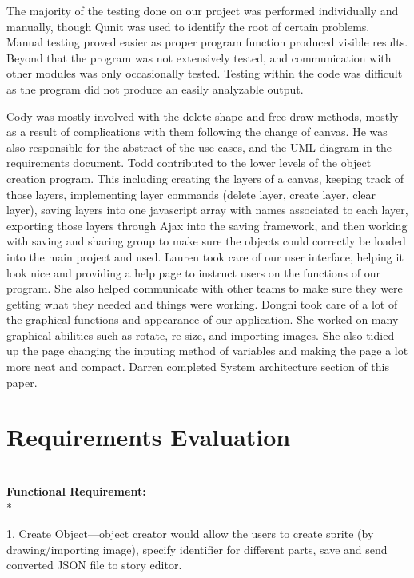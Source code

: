 \documentclass[a4paper, 11pt]{article} %
\begin{document}
        	The majority of the testing done on our project was performed individually and manually, though Qunit was used to identify the root of certain problems. Manual testing proved easier as proper program function produced visible results. Beyond that the program was not extensively tested, and communication with other modules was only occasionally tested. Testing within the code was difficult as the program did not produce an easily analyzable output.
        	
        	Cody was mostly involved with the delete shape and free draw methods, mostly as a result of complications with them following the change of canvas. He was also responsible for the abstract of the use cases, and the UML diagram in the requirements document. Todd contributed to the lower levels of the object creation program. This including creating the layers of a canvas, keeping track of those layers, implementing layer commands (delete layer, create layer, clear layer), saving layers into one javascript array with names associated to each layer, exporting those layers through Ajax into the saving framework, and then working with saving and sharing group to make sure the objects could correctly be loaded into the main project and used. Lauren took care of our user interface, helping it look nice and providing a help page to instruct users on the functions of our program. She also helped communicate with other teams to make sure they were getting what they needed and things were working. Dongni took care of a lot of the graphical functions and appearance of our application. She worked on many graphical abilities such as rotate, re-size, and importing images. She also tidied up the page changing the inputing method of variables and making the page a lot more neat and compact. Darren completed System architecture section of this paper.



\section*{Requirements Evaluation}

\\
\textbf {Functional Requirement:} \\*

1.	Create Object—object creator would allow the users to create sprite (by drawing/importing image), specify identifier for different parts, save and send converted JSON file to story editor.
\end{document}
